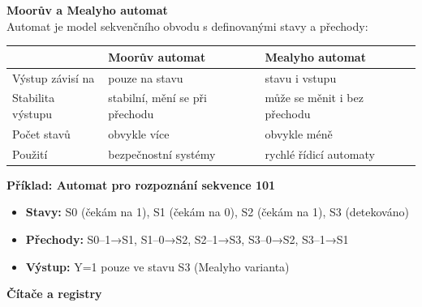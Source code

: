 \documentclass[a4paper,10pt]{article}
\begin{document}
\begin{vysvetlenibox}
\textbf{Moorův a Mealyho automat}\\
Automat je model sekvenčního obvodu s definovanými stavy a přechody:

\begin{center}
\begin{tabularx}{0.95\linewidth}{@{} l X X @{}}
    \toprule
    & \textbf{Moorův automat} & \textbf{Mealyho automat} \\
    \midrule
    Výstup závisí na & pouze na stavu & stavu i vstupu \\
    Stabilita výstupu & stabilní, mění se při přechodu & může se měnit i bez přechodu \\
    Počet stavů & obvykle více & obvykle méně \\
    Použití & bezpečnostní systémy & rychlé řídicí automaty \\
    \bottomrule
\end{tabularx}
\end{center}

\textbf{Příklad: Automat pro rozpoznání sekvence 101}\\
\begin{itemize}[noitemsep, leftmargin=1.4em, topsep=4pt]
    \item \textbf{Stavy:} S0 (čekám na 1), S1 (čekám na 0), S2 (čekám na 1), S3 (detekováno)
    \item \textbf{Přechody:} S0--1→S1, S1--0→S2, S2--1→S3, S3--0→S2, S3--1→S1
    \item \textbf{Výstup:} Y=1 pouze ve stavu S3 (Mealyho varianta)
\end{itemize}

\textbf{Čítače a registry}


\end{vysvetlenibox}
\end{document}
